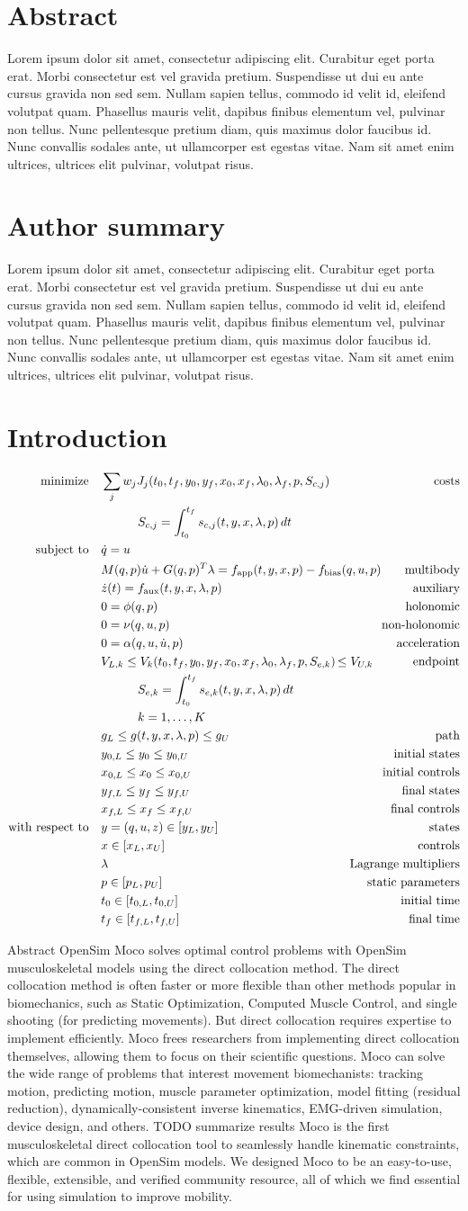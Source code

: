 \documentclass[10pt,letterpaper]{article}
\newcommand{\ocp}{
\begin{align}
    \begin{aligned}
        \mbox{minimize}
         \quad & \sum_j w_{j} J_{j}(t_0, t_f, y_0, y_f, x_{0}, x_{f}, \lambda_0, \lambda_f, p, S_{c,j}) & \textrm{costs} \\
        & \quad\quad\quad S_{c,j} = \int_{t_0}^{t_f} s_{c,j}(t, y, x, \lambda, p)\,dt  \\
        \mbox{subject to}
         \quad & \dot{q} = u \\
         & M(q, p)\dot{u} + G(q, p)^T \lambda = f_{\mathrm{app}}(t, y, x, p) - \mathrlap{f_{\mathrm{bias}}(q, u, p)}  & \textrm{multibody} \\
         & \dot{z}(t) = f_{\mathrm{aux}}(t, y, x, \lambda, p) & \textrm{auxiliary} \\
         & 0 = \phi(q, p) & \textrm{holonomic} \\
         & 0 = \nu(q, u, p) & \textrm{non-holonomic} \\
         & 0 = \alpha(q, u, \dot{u}, p) & \textrm{acceleration} \\
         & V_{L,k} \leq V_k(t_0, t_f, y_0, y_f, x_{0}, x_{f}, \lambda_0, \lambda_f, p, S_{e,k}) \,\mathrlap{\leq V_{U,k}} & \textrm{endpoint} \\
         & \quad\quad\quad S_{e,k} = \int_{t_0}^{t_f} s_{e,k}(t, y, x, \lambda, p)\,dt \\
         & \quad\quad\quad k = 1, \ldots, K \\
         & g_{L} \leq g(t, y, x, \lambda, p) \leq g_{U} & \textrm{path} \\
         & y_{0,L} \leq y_0 \leq y_{0,U} & \textrm{initial states} \\
         & x_{0,L} \leq x_0 \leq x_{0,U} & \textrm{initial controls} \\
         & y_{f,L} \leq y_f \leq y_{f,U} & \textrm{final states} \\
         & x_{f,L} \leq x_f \leq x_{f,U} & \textrm{final controls} \\
         \mbox{with respect to} \quad
         & y = (q, u, z) \in [y_{L}, y_{U}] & \textrm{states} \\
         & x \in [x_{L}, x_{U}] & \textrm{controls} \\
         & \lambda & \textrm{Lagrange multipliers} \\
         & p \in [p_{L}, p_{U}] & \textrm{static parameters} \\
         & t_0 \in [t_{0,L}, t_{0,U}] & \textrm{initial time} \\
         & t_f \in [t_{f,L}, t_{f,U}] & \textrm{final time}
    \end{aligned}
\end{align}
}
\begin{document}
\section*{Abstract}
Lorem ipsum dolor sit amet, consectetur adipiscing elit. Curabitur eget porta erat. Morbi consectetur est vel gravida pretium. Suspendisse ut dui eu ante cursus gravida non sed sem. Nullam sapien tellus, commodo id velit id, eleifend volutpat quam. Phasellus mauris velit, dapibus finibus elementum vel, pulvinar non tellus. Nunc pellentesque pretium diam, quis maximus dolor faucibus id. Nunc convallis sodales ante, ut ullamcorper est egestas vitae. Nam sit amet enim ultrices, ultrices elit pulvinar, volutpat risus.


\section*{Author summary}
Lorem ipsum dolor sit amet, consectetur adipiscing elit. Curabitur eget porta erat. Morbi consectetur est vel gravida pretium. Suspendisse ut dui eu ante cursus gravida non sed sem. Nullam sapien tellus, commodo id velit id, eleifend volutpat quam. Phasellus mauris velit, dapibus finibus elementum vel, pulvinar non tellus. Nunc pellentesque pretium diam, quis maximus dolor faucibus id. Nunc convallis sodales ante, ut ullamcorper est egestas vitae. Nam sit amet enim ultrices, ultrices elit pulvinar, volutpat risus.

\linenumbers

\section*{Introduction}




\ocp


Abstract
OpenSim Moco solves optimal control problems with OpenSim musculoskeletal models using the direct collocation method.
The direct collocation method is often faster or more flexible than other methods popular in biomechanics, such as Static Optimization, Computed Muscle Control, and single shooting (for predicting movements). But direct collocation requires expertise to implement efficiently. Moco frees researchers from implementing direct collocation themselves, allowing them to focus on their scientific questions.
Moco can solve the wide range of problems that interest movement biomechanists: tracking motion, predicting motion, muscle parameter optimization, model fitting (residual reduction), dynamically-consistent inverse kinematics, EMG-driven simulation, device design, and others.
TODO summarize results
Moco is the first musculoskeletal direct collocation tool to seamlessly handle kinematic constraints, which are common in OpenSim models.
We designed Moco to be an easy-to-use, flexible, extensible, and verified community resource, all of which we find essential for using simulation to improve mobility.
\end{document}
